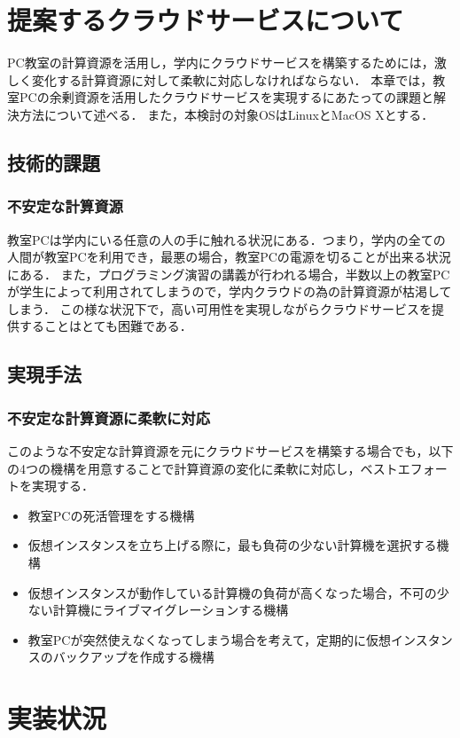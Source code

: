 \documentclass[11pt,a4paper]{jsarticle}
\begin{document}
\section{提案するクラウドサービスについて}
PC教室の計算資源を活用し，学内にクラウドサービスを構築するためには，激しく変化する計算資源に対して柔軟に対応しなければならない．
本章では，教室PCの余剰資源を活用したクラウドサービスを実現するにあたっての課題と解決方法について述べる．
また，本検討の対象OSはLinuxとMacOS Xとする．
\subsection{技術的課題}
\subsubsection{不安定な計算資源}
教室PCは学内にいる任意の人の手に触れる状況にある．つまり，学内の全ての人間が教室PCを利用でき，最悪の場合，教室PCの電源を切ることが出来る状況にある．
また，プログラミング演習の講義が行われる場合，半数以上の教室PCが学生によって利用されてしまうので，学内クラウドの為の計算資源が枯渇してしまう．
この様な状況下で，高い可用性を実現しながらクラウドサービスを提供することはとても困難である．
\subsection{実現手法}
\subsubsection{不安定な計算資源に柔軟に対応}
このような不安定な計算資源を元にクラウドサービスを構築する場合でも，以下の4つの機構を用意することで計算資源の変化に柔軟に対応し，ベストエフォートを実現する．
\begin{itemize}
	\item 教室PCの死活管理をする機構
	\item 仮想インスタンスを立ち上げる際に，最も負荷の少ない計算機を選択する機構
	\item 仮想インスタンスが動作している計算機の負荷が高くなった場合，不可の少ない計算機にライブマイグレーションする機構
	\item 教室PCが突然使えなくなってしまう場合を考えて，定期的に仮想インスタンスのバックアップを作成する機構
\end{itemize}

\section{実装状況}
\end{document}
